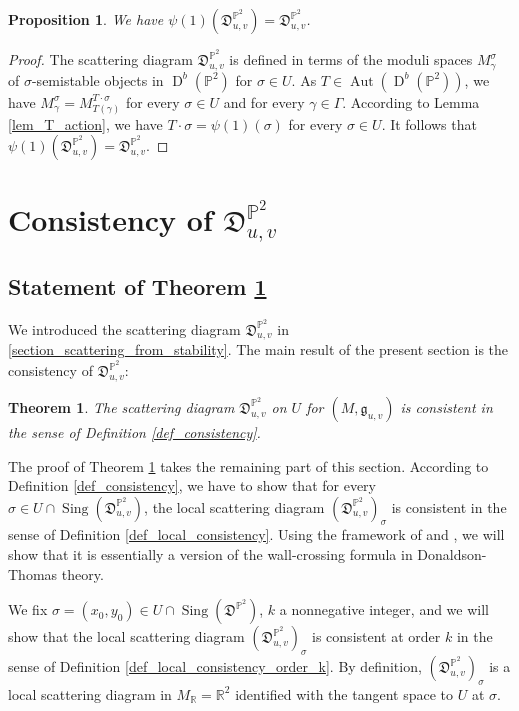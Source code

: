 \documentclass[12pt, a4paper]{amsart}
\newtheorem{thm}[defn]{Theorem}
\newtheorem{prop}[defn]{Proposition}
\newcommand\PP{\mathbb P}
\newcommand\R{\mathbb R}
\newcommand\fD{\mathfrak D}
\newcommand\fg{\mathfrak g}
\newcommand\Aut{\operatorname{Aut}}
\newcommand\D{\operatorname{D}}
\newcommand\Sing{\operatorname{Sing}}
\begin{document}
\begin{prop} \label{prop_psi(1)_P2}
We have 
$\psi(1)(\fD_{u,v}^{\PP^2})
=\fD_{u,v}^{\PP^2}$.
\end{prop}

\begin{proof}
The scattering diagram $\fD_{u,v}^{\PP^2}$
is defined in terms of the moduli spaces
$M_\gamma^\sigma$ of $\sigma$-semistable objects in $\D^b(\PP^2)$ for 
$\sigma \in U$. As
$T\in \Aut(\D^b(\PP^2))$, we have 
$M_\gamma^\sigma=M_{T(\gamma)}^{T \cdot \sigma}$ for every $\sigma \in U$ and for every $\gamma \in \Gamma$.
According to Lemma \ref{lem_T_action}, we have 
$T \cdot \sigma = \psi(1)(\sigma)$ for every $\sigma \in U$. It follows that
$\psi(1)(\fD_{u,v}^{\PP^2})
=\fD_{u,v}^{\PP^2}$.
\end{proof}




\section{Consistency of $\fD_{u,v}^{\PP^2}$}
\label{section_consistency_proof}

\subsection{Statement of Theorem \ref{thm_consistency}}
We introduced the scattering diagram 
$\fD_{u,v}^{\PP^2}$ in
\cref{section_scattering_from_stability}.
The main result of the present section is the consistency of $\fD_{u,v}^{\PP^2}$:

\begin{thm} \label{thm_consistency}
The scattering diagram $\fD_{u,v}^{\PP^2}$ on $U$ for $(M, \fg_{u,v})$ is consistent in the sense of Definition \ref{def_consistency}.
\end{thm}

The proof of Theorem \ref{thm_consistency} takes the remaining part of this section. 
According to Definition
\ref{def_consistency}, we have to show that for every $\sigma \in U \cap \Sing(\fD^{\PP^2}_{u,v})$, the local scattering diagram 
$(\fD_{u,v}^{\PP^2})_\sigma$ is consistent in the sense of Definition \ref{def_local_consistency}.
Using the framework of 
\cite{meinhardt2017donaldson} and
 \cite{meinhardt2015donaldson}, we will show that it is essentially a version of the wall-crossing 
formula in Donaldson-Thomas theory.


We fix $\sigma =(x_0,y_0)\in U \cap \Sing(\fD^{\PP^2})$, $k$ a nonnegative integer, and we will show that 
the local scattering diagram
$(\fD_{u,v}^{\PP^2})_\sigma$ is consistent at order $k$ in the sense of Definition 
\ref{def_local_consistency_order_k}.
By definition, $(\fD_{u,v}^{\PP^2})_\sigma$ is a local scattering diagram in $M_\R=\R^2$ identified with the tangent space to 
$U$ at $\sigma$.
\end{document}
